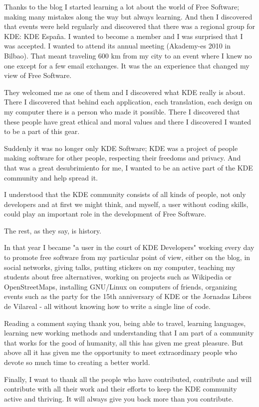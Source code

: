 Thanks to the blog I started learning a lot about the world of Free Software; making many mistakes along the way but always learning.
And then I discovered that events were held regularly and discovered that there was a regional group for KDE: KDE Espa\~na. I wanted to become a member and I was surprised that I was accepted. I wanted to attend its annual meeting (Akademy-es 2010 in Bilbao). That meant traveling 600 km from my city to an event where I knew no one except for a few email exchanges. It was the an experience that changed my view of Free Software.

They welcomed me as one of them and I discovered what KDE really is about. There I discovered that behind each application, each translation, each design on my computer there is a person who made it possible. There I discovered that these people have great ethical and moral values and there I discovered I wanted to be a part of this gear.

Suddenly it was no longer only KDE Software; KDE was a project of people making software for other people, respecting their freedoms and privacy. And that was a great desubrimiento for me, I wanted to be an active part of the KDE community and help spread it.

I understood that the KDE community consists of all kinds of people, not only developers and at first we might think, and myself, a user without coding skills, could play an important role in the development of Free Software.

The rest, as they say, is history.

In that year I became "a user in the court of KDE Developers" working every day to promote free software from my particular point of view, either on the blog, in social networks, giving talks, putting stickers on my computer, teaching my students about free alternatives, working on projects such as Wikipedia or OpenStreetMaps, installing GNU/Linux on computers of friends, organizing events such as the party for the 15th anniversary of KDE or the Jornadas Libres de Vila­real - all without knowing how to write a single line of code.

Reading a comment saying thank you, being able to travel, learning languages, learning new working methods and understanding that I am part of a community that works for the good of humanity, all this has given me great pleasure. But above all it has given me the opportunity to meet extraordinary people who devote so much time to creating a better world.

Finally, I want to thank all the people who have contributed, contribute and will contribute with all their work and their efforts to keep the KDE community active and thriving. It will always give you back more than you contribute.
